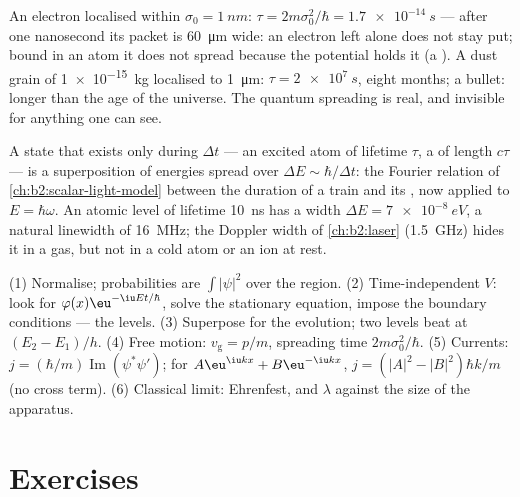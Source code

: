 \begin{example}\label{ex:b2:schrodinger-wave-functions:spreading}
An electron localised within $\sigma_0 = \qty{1}{nm}$: $\tau = 2m\sigma_0^2/\hbar
= \qty{1.7e-14}{s}$ --- after one nanosecond its packet is \qty{60}{\micro m}
wide: an electron left alone does not stay put; bound in an atom it
does not spread because the potential holds it (a ).
A dust grain of \qty{1e-15}{kg} localised to \qty{1}{\micro m}: $\tau =
\qty{2e7}{s}$, eight months; a bullet: longer than the age of the universe.
The quantum spreading is real, and invisible for anything one can see.
\end{example}

\begin{remark}\label{rem:b2:schrodinger-wave-functions:energytime}
A state that exists only during $\Delta t$ --- an excited atom of lifetime
$\tau$, a  of length $c\tau$ --- is a superposition of energies
spread over $\Delta E \sim \hbar/\Delta t$: the Fourier relation of
\cref{ch:b2:scalar-light-model} between the duration of a train and its
, now applied to $E = \hbar\omega$. An atomic level of
lifetime \qty{10}{ns} has a width $\Delta E = \qty{7e-8}{eV}$, a natural
linewidth of \qty{16}{MHz}; the Doppler width of \cref{ch:b2:laser}
(\qty{1.5}{GHz}) hides it in a gas, but not in a cold atom or an ion at
rest.
\end{remark}

\begin{method}\label{meth:b2:schrodinger-wave-functions:method}
(1) Normalise; probabilities are $\int|\psi|^2$ over the region. (2)
Time-independent $V$: look for $\varphi(x)\eu^{-\iu Et/\hbar}$, solve the
stationary equation, impose the boundary conditions --- the levels.
(3) Superpose  for the evolution; two levels beat at
$(E_2 - E_1)/h$. (4) Free motion: $v_{\text{g}} = p/m$, spreading time
$2m\sigma_0^2/\hbar$. (5) Currents: $j = (\hbar/m)\operatorname{Im}(\psi^*\psi')$;
for $A\eu^{\iu kx} + B\eu^{-\iu kx}$, $j = (|A|^2 - |B|^2)\hbar k/m$ (no cross term).
(6) Classical limit: Ehrenfest, and $\lambda$ against the size of the
apparatus.
\end{method}

\section{Exercises}

